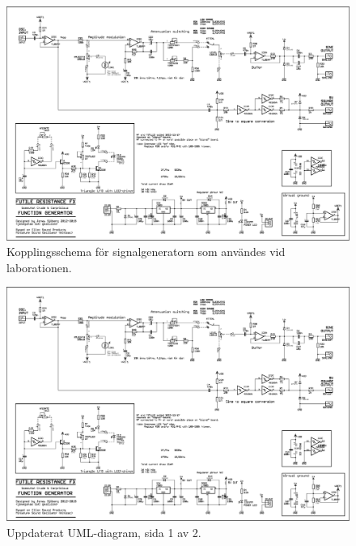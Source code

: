 \begin{figure}[ht]\label{fig:siggen-sch2}
  \centering
  \includegraphics[width=\linewidth]{img/signal-generator_schematic-1}
  \caption[] {Kopplingsschema för signalgeneratorn som användes vid laborationen.}
\end{figure}

\begin{figure}\label{fig:siggen-schem-1}
 \centering
 \includegraphics[width=\linewidth]{img/signal-generator_schematic-1}
 \caption{Uppdaterat UML-diagram, sida 1 av 2.}
\end{figure}


